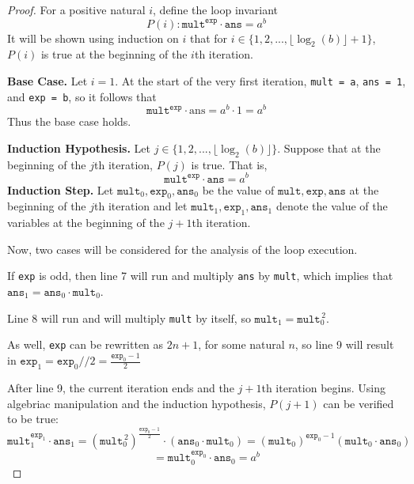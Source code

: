 \documentclass[11pt]{article}
\begin{document}
\begin{enumerate}[label=(\alph*)]
\begin{proof}
            For a positive natural \(i\), define the loop invariant
            \[
                P(i) : \texttt{mult}^\texttt{exp} \cdot \texttt{ans} = a^b
            \]
            It will be shown using induction on \(i\) that for \(i \in \{1, 2,..., \lfloor \log _2 (b) \rfloor + 1\}\), \(P(i)\) is true at the beginning of the \(i\)th iteration.

            \textbf{Base Case.} Let \(i=1\). At the start of the very first iteration, \verb|mult = a|, \verb|ans = 1|, and \verb|exp = b|, so it follows that
            \[
                \texttt{mult}^\texttt{exp} \cdot \text{ans} = a^b \cdot 1 = a^b
            \]
            Thus the base case holds.

            \textbf{Induction Hypothesis.} Let \(j \in \{1,2,..., \lfloor \log _2(b) \rfloor\}\). Suppose that at the beginning of the \(j\)th iteration, \(P(j)\) is true. That is,
            \[
                \texttt{mult}^\texttt{exp} \cdot \texttt{ans} = a^b
            \]
            \textbf{Induction Step.} Let \(\texttt{mult}_{0},\texttt{exp}_{0},\texttt{ans}_{0}\) be the value of  \(\texttt{mult},\texttt{exp},\texttt{ans}\) at the beginning of the \(j\)th iteration and let \(\texttt{mult}_{1},\texttt{exp}_{1},\texttt{ans}_{1}\) denote the value of the variables at the beginning of the \(j+1\)th iteration.

            Now, two cases will be considered for the analysis of the loop execution.

            If \verb|exp| is odd, then line 7 will run and multiply \verb|ans| by \verb|mult|, which implies that \(\texttt{ans}_1 = \texttt{ans}_0 \cdot \texttt{mult}_0\).

            Line 8 will run and will multiply \verb|mult| by itself, so \(\texttt{mult}_1 = \texttt{mult}_0^{\, 2}\).
            
            As well, \verb|exp| can be rewritten as \(2n+1\), for some natural \(n\), so line 9 will result in \(\texttt{exp}_1 = \texttt{exp}_0 // 2 = \frac{\texttt{exp}_0 - 1}{2}\)

            After line 9, the current iteration ends and the \(j+1\)th iteration begins. Using algebriac manipulation and the induction hypothesis, \(P(j+1)\) can be verified to be true:
            \[
                \texttt{mult}_1^{\texttt{exp}_1} \cdot \texttt{ans}_1 = (\texttt{mult}_0^{\, 2})^\frac{\texttt{exp}_0 - 1}{2} \cdot (\texttt{ans}_0 \cdot \texttt{mult}_0) = (\texttt{mult}_0)^{\texttt{exp}_0 - 1}(\texttt{mult}_0 \cdot \texttt{ans}_0)
            \]
            \[
                = \texttt{mult}_0 ^{\texttt{exp}_0} \cdot \texttt{ans}_0 = a^b
            \]


\end{proof}
\end{enumerate}
\end{document}
